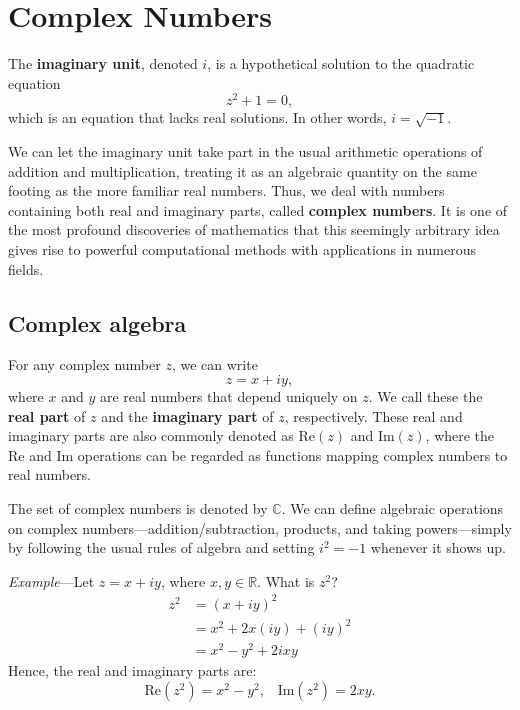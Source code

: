 \documentclass[10pt,a4paper]{article}
\begin{document}
\setcounter{page}{19}
    
\section{Complex Numbers}\label{complex-numbers}

The \textbf{imaginary unit}, denoted $i$, is a hypothetical solution
to the quadratic equation
\begin{equation}
z^2 + 1 = 0,
\end{equation}
which is an equation that lacks real solutions. In other words,
$i = \sqrt{-1}$.

We can let the imaginary unit take part in the usual arithmetic
operations of addition and multiplication, treating it as an algebraic
quantity on the same footing as the more familiar real numbers. Thus, we
deal with numbers containing both real and imaginary parts, called
\textbf{complex numbers}. It is one of the most profound discoveries of
mathematics that this seemingly arbitrary idea gives rise to powerful
computational methods with applications in numerous fields.

    \hypertarget{complex-algebra}{%
\subsection{Complex algebra}\label{complex-algebra}}

For any complex number $z$, we can write
\begin{equation}
z = x + i y,
\end{equation}
where $x$ and $y$ are real numbers that depend uniquely on $z$. We
call these the \textbf{real part} of $z$ and the \textbf{imaginary
  part} of $z$, respectively. These real and imaginary parts are also
commonly denoted as $\mathrm{Re}(z)$ and $\mathrm{Im}(z)$, where the
$\mathrm{Re}$ and $\mathrm{Im}$ operations can be regarded as
functions mapping complex numbers to real numbers.

The set of complex numbers is denoted by $\mathbb{C}$. We can define
algebraic operations on complex numbers---addition/subtraction,
products, and taking powers---simply by following the usual rules of
algebra and setting $i^2 = -1$ whenever it shows up.

\begin{framed} \noindent
\textit{Example}---Let $z = x + i y$, where $x, y \in \mathbb{R}$. What is
$z^2$?
\begin{align*}
  z^2 &= (x+iy)^2 \\&= x^2 + 2x(iy) + (iy)^2 \\&= x^2 - y^2 + 2ixy
\end{align*}
  Hence, the real and imaginary parts are:
  \begin{equation*}
    \mathrm{Re}(z^2) = x^2 -y^2, \;\;\; \mathrm{Im}(z^2) = 2xy.
  \end{equation*}
\end{framed}
\end{document}
